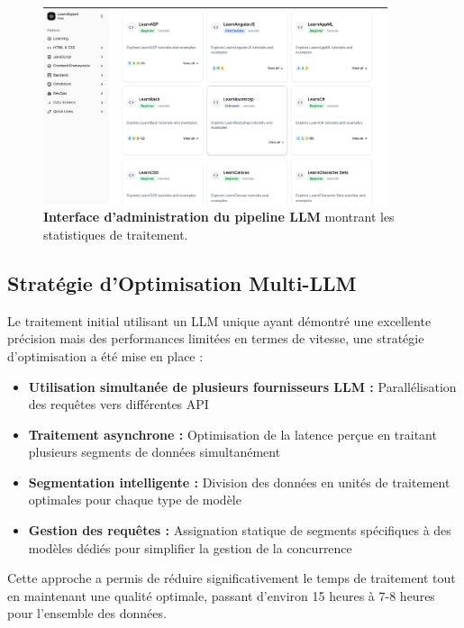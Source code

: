 \begin{figure}[h!]
  \centering
  \includegraphics[width=0.9\textwidth,keepaspectratio]{week_3_img/Screenshot 2025-05-20 164411.png}
  \caption{\textbf{Interface d'administration du pipeline LLM} montrant les statistiques de traitement.}
  \label{fig:llm_pipeline}
\end{figure}

\subsection{Stratégie d'Optimisation Multi-LLM}

Le traitement initial utilisant un LLM unique ayant démontré une excellente précision mais des performances limitées en termes de vitesse, une stratégie d'optimisation a été mise en place :

\begin{itemize}
  \item \textbf{Utilisation simultanée de plusieurs fournisseurs LLM :} Parallélisation des requêtes vers différentes API
  \item \textbf{Traitement asynchrone :} Optimisation de la latence perçue en traitant plusieurs segments de données simultanément
  \item \textbf{Segmentation intelligente :} Division des données en unités de traitement optimales pour chaque type de modèle
  \item \textbf{Gestion des requêtes :} Assignation statique de segments spécifiques à des modèles dédiés pour simplifier la gestion de la concurrence
\end{itemize}

Cette approche a permis de réduire significativement le temps de traitement tout en maintenant une qualité optimale, passant d'environ 15 heures à 7-8 heures pour l'ensemble des données.

